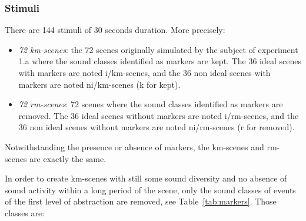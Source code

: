 \documentclass[twoside,twocolumn]{article}
\begin{document}
\subsubsection*{Stimuli}


There are 144 stimuli of 30 seconds duration. More precisely:

\begin{itemize}
\item \emph{72 km-scenes}: the 72 scenes originally simulated by the subject of experiment 1.a where the sound classes identified as markers are kept. The 36 ideal scenes with markers are noted i/km-scenes, and the 36 non ideal scenes with markers are noted ni/km-scenes (k for kept).
\item \emph{72 rm-scenes}:  72 scenes where the sound classes identified as markers are removed. The 36 ideal scenes without markers are noted i/rm-scenes, and the 36 non ideal scenes without markers are noted ni/rm-scenes (r for removed).
\end{itemize}



Notwithstanding the presence or absence of markers, the km-scenes and rm-scenes are exactly the same.


In order to create km-scenes with still some sound diversity and no  absence of sound activity within a long period of the scene, only the sound classes of events of the first level of abstraction are removed, see Table~\ref{tab:markers}. Those classes are:
\end{document}
